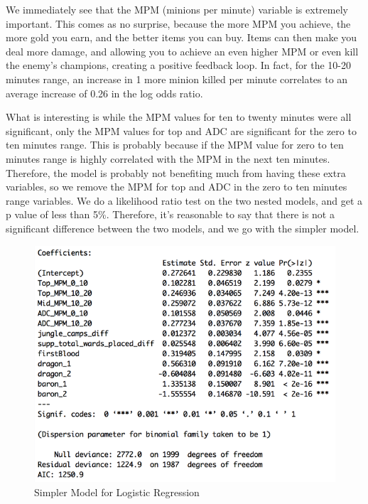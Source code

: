 \documentclass[runningheads]{llncs}
\begin{document}
	
	
	We immediately see that the MPM (minions per minute) variable is extremely important. This comes as no surprise, because the more MPM you achieve, the more gold you earn, and the better items you can buy. Items can then make you deal more damage, and allowing you to achieve an even higher MPM or even kill the enemy’s champions, creating a positive feedback loop. In fact, for the 10-20 minutes range, an increase in 1 more minion killed per minute correlates to an average increase of 0.26 in the log odds ratio.

	What is interesting is while the MPM values for ten to twenty minutes were all significant, only the MPM values for top and ADC are significant for the zero to ten minutes range. This is probably because if the MPM value for zero to ten minutes range is highly correlated with the MPM in the next ten minutes. Therefore, the model is probably not benefiting much from having these extra variables, so we remove the MPM for top and ADC in the zero to ten minutes range variables. We do a likelihood ratio test on the two nested models, and get a p value of less than 5\%. Therefore, it’s reasonable to say that there is not a significant difference between the two models, and we go with the simpler model.
	
	\begin{figure}[!htb]
		\centering
		\includegraphics[width=\textwidth]{images/lr_simple.png}
		\caption{Simpler Model for Logistic Regression}
	\end{figure}
	
\end{document}
